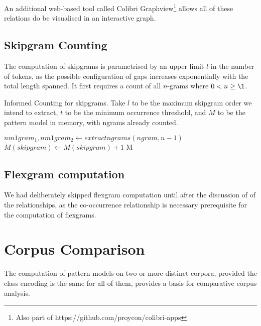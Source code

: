 An additional web-based tool called Colibri Graphview\footnote{Also part of
https://github.com/proycon/colibri-apps} allows all of these relations do be
visualised in an interactive graph.

\subsection{Skipgram Counting}
\label{sec:skipgramcount}

The computation of skipgrams is parametrised by an upper limit $l$ in the number of
tokens, as the possible configuration of gaps increases exponentially with the
total length spanned. It first requires a count of all $n$-grams where $0<n\geq\l$. 

\begin{algorithm} \caption{Informed Counting for skipgrams.  Take $l$
to be the maximum skipgram order we intend to extract, $t$ to be the minimum occurrence threshold, and $M$ to be the
pattern model in memory, with ngrams already counted.}
\label{alg:skipgramcount}
\begin{algorithmic}
            \State  $nm1gram_1, nm1gram_2 \leftarrow extractngrams(ngram,n-1)$
                \State $M(skipgram) \leftarrow M(skipgram) + 1$
            \EndIf
        \EndFor 
    \EndFor
  \EndFor
  \Return M
\EndFor \\
\end{algorithmic}
\end{algorithm}


\subsection{Flexgram computation}

We had deliberately skipped flexgram computation until after the discussion of
of the relationships, as the co-occurrence relationship is necessary
prerequisite for the computation of flexgrams.


\section{Corpus Comparison}

The computation of pattern models on two or more distinct corpora, provided the
class encoding is the same for all of them, provides a basis for comparative
corpus analysis.

